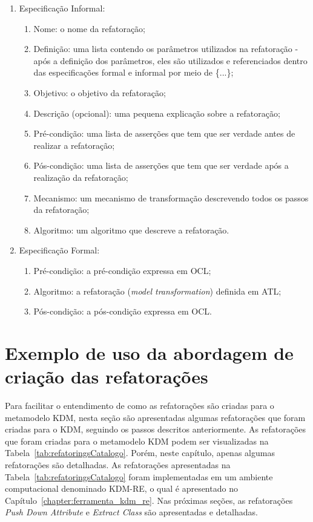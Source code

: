 \begin{enumerate}
	\item Especificação Informal:
		\begin{enumerate}
			\item Nome: o nome da refatoração;
			\item Definição: uma lista contendo os parâmetros utilizados na refatoração - após a definição dos parâmetros, eles são utilizados e referenciados dentro das especificações formal e informal por meio de \{...\};
			\item Objetivo: o objetivo da refatoração;
			\item Descrição (opcional): uma pequena explicação sobre a refatoração;
			\item Pré-condição: uma lista de asserções que tem que ser verdade antes de realizar a refatoração;
			\item Pós-condição: uma lista de asserções que tem que ser verdade após a realização da refatoração;
			\item Mecanismo: um mecanismo de transformação descrevendo todos os passos da refatoração;
			\item Algoritmo: um algoritmo que descreve a refatoração.
		\end{enumerate}
	\item Especificação Formal:
		\begin{enumerate}
			\item Pré-condição: a pré-condição expressa em OCL;
			\item Algoritmo: a refatoração (\textit{model transformation}) definida em ATL;
			\item Pós-condição: a pós-condição expressa em OCL.
		\end{enumerate}
\end{enumerate}


\section{Exemplo de uso da abordagem de criação das refatorações}\label{sec:catalogo_refatoracao_kdm}

Para facilitar o entendimento de como as refatorações são criadas para o metamodelo KDM, nesta seção são apresentadas algumas refatorações que foram criadas para o KDM, seguindo os passos descritos anteriormente. As refatorações que foram criadas para o metamodelo KDM podem ser visualizadas na Tabela~\ref{tab:refatoringsCatalogo}. Porém, neste capítulo, apenas algumas refatorações são detalhadas. As refatorações apresentadas na Tabela~\ref{tab:refatoringsCatalogo} foram implementadas em um ambiente computacional denominado KDM-RE, o qual é apresentado no Capítulo~\ref{chapter:ferramenta_kdm_re}. Nas próximas seções, as refatorações \textit{Push Down Attribute} e \textit{Extract Class} são apresentadas e detalhadas. %


